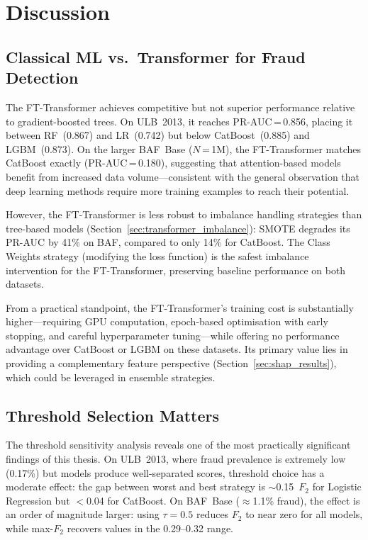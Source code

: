 \clearpage

\section{Discussion}
\label{sec:discussion}

\subsection{Classical ML vs.\ Transformer for Fraud Detection}

The FT-Transformer achieves competitive but not superior performance relative to gradient-boosted trees.
On ULB~2013, it reaches PR-AUC\,=\,0.856, placing it between RF~(0.867) and LR~(0.742) but below CatBoost~(0.885) and LGBM~(0.873).
On the larger BAF~Base ($N$\,=\,1M), the FT-Transformer matches CatBoost exactly (PR-AUC\,=\,0.180), suggesting that attention-based models benefit from increased data volume---consistent with the general observation that deep learning methods require more training examples to reach their potential.

However, the FT-Transformer is less robust to imbalance handling strategies than tree-based models (Section~\ref{sec:transformer_imbalance}): SMOTE degrades its PR-AUC by 41\% on BAF, compared to only 14\% for CatBoost.
The Class Weights strategy (modifying the loss function) is the safest imbalance intervention for the FT-Transformer, preserving baseline performance on both datasets.

From a practical standpoint, the FT-Transformer's training cost is substantially higher---requiring GPU computation, epoch-based optimisation with early stopping, and careful hyperparameter tuning---while offering no performance advantage over CatBoost or LGBM on these datasets.
Its primary value lies in providing a complementary feature perspective (Section~\ref{sec:shap_results}), which could be leveraged in ensemble strategies.

\subsection{Threshold Selection Matters}

The threshold sensitivity analysis reveals one of the most practically significant findings of this thesis.
On ULB~2013, where fraud prevalence is extremely low (0.17\%) but models produce well-separated scores, threshold choice has a moderate effect: the gap between worst and best strategy is $\sim$0.15~$F_2$ for Logistic Regression but $<$0.04 for CatBoost.
On BAF~Base ($\approx$1.1\% fraud), the effect is an order of magnitude larger: using $\tau=0.5$ reduces $F_2$ to near zero for all models, while max-$F_2$ recovers values in the 0.29--0.32 range.

